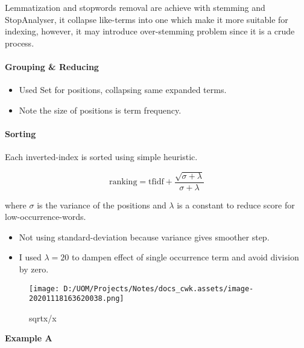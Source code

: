 \documentclass[
]{article}
\begin{document}
Lemmatization and stopwords removal are achieve with stemming and
StopAnalyser, it collapse like-terms into one which make it more
suitable for indexing, however, it may introduce over-stemming problem
since it is a crude process.

\hypertarget{header-n50}{%
\paragraph{Grouping \& Reducing}\label{header-n50}}

\begin{itemize}
\item
  Used Set for positions, collapsing same expanded terms.
\item
  Note the size of positions is term frequency.
\end{itemize}

\hypertarget{header-n69}{%
\paragraph{Sorting}\label{header-n69}}

Each inverted-index is sorted using simple heuristic.

\[\text{ranking}=\text{tfidf}+\frac{\sqrt{\sigma+\lambda}}{\sigma+\lambda}\]

where \(\sigma\) is the variance of the positions and \(\lambda\) is a
constant to reduce score for low-occurrence-words.

\begin{itemize}
\item
  Not using standard-deviation because variance gives smoother step.
\item
  I used \(\lambda=20\) to dampen effect of single occurrence term and
  avoid division by zero.
\end{itemize}

\begin{figure}
\centering
\texttt{[image: D:/UOM/Projects/Notes/docs\_cwk.assets/image-20201118163620038.png]}
\caption{sqrtx/x}
\end{figure}

\textbf{Example A}
\end{document}
